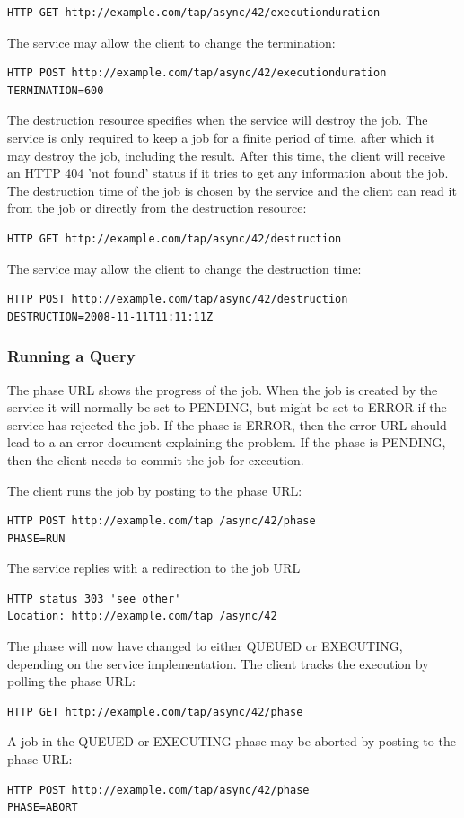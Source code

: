\documentclass[11pt,letter]{ivoa}
\begin{document}
{\begin{verbatim}
HTTP GET http://example.com/tap/async/42/executionduration
\end{verbatim}
The service may allow the client to change the termination:
\begin{verbatim}
HTTP POST http://example.com/tap/async/42/executionduration
TERMINATION=600
\end{verbatim}
The destruction resource specifies when the service will destroy the job. The 
service is only required to keep a job for a finite period of time, after which 
it may destroy the job, including the result. After this time, the client will 
receive an HTTP 404 'not found' status if it tries to get any information about 
the job. The destruction time of the job is chosen by the service and the client 
can read it from the job or directly from the destruction resource:
\begin{verbatim}
HTTP GET http://example.com/tap/async/42/destruction
\end{verbatim}
The service may allow the client to change the destruction time:
\begin{verbatim}
HTTP POST http://example.com/tap/async/42/destruction
DESTRUCTION=2008-11-11T11:11:11Z
\end{verbatim}

\subsubsection{Running a Query}
The phase URL shows the progress of the job. When the job is created by the 
service it will normally be set to PENDING, but might be set to ERROR if the 
service has rejected the job. If the phase is ERROR, then the error URL should 
lead to a an error document explaining the problem. If the phase is PENDING, 
then the client needs to commit the job for execution.

The client runs the job by posting to the phase URL:
\begin{verbatim}
HTTP POST http://example.com/tap /async/42/phase
PHASE=RUN
\end{verbatim}

The service replies with a redirection to the job URL
\begin{verbatim}
HTTP status 303 'see other'
Location: http://example.com/tap /async/42
\end{verbatim}
The phase will now have changed to either QUEUED or EXECUTING, depending on the 
service implementation. The client tracks the execution by polling the phase 
URL:
\begin{verbatim}
HTTP GET http://example.com/tap/async/42/phase
\end{verbatim}
A job in the  QUEUED or EXECUTING phase may be aborted by posting to the phase 
URL:
\begin{verbatim}
HTTP POST http://example.com/tap/async/42/phase
PHASE=ABORT
\end{verbatim}

}
\end{document}

